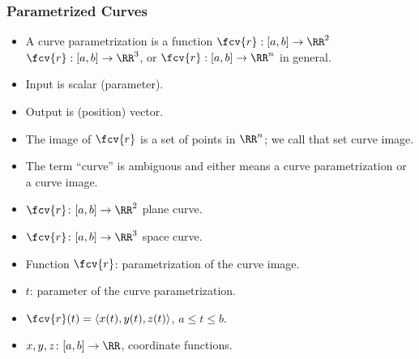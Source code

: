 \begin{frame}
\frametitle{Parametrized Curves}
\begin{itemize}
\item \alert<5>{A curve parametrization is a function} $\fcv{r}: [a,b] \to \RR^2$ $\fcv{r}:[a,b]\to \RR^{3}$, or $\fcv{r}:[a,b]\to\RR^{n}  $ in general.
\item<2-> Input is scalar (parameter).
\item<3-> Output is (position) vector.
\item<4-> The image of $\fcv{r}$ is a \alert<5>{ set of points} in $\RR^{n}$; we call that set \alert<5>{curve image}.
\item<5-> The term ``curve'' is ambiguous and either means a \alert<5>{ curve parametrization or a curve image}. 
\item<6-> $\fcv{r} \colon [a,b] \to \RR^2$ plane curve.
\item<7-> $\fcv{r} \colon [a,b] \to \RR^3$ space curve.
\item<8-> Function $\fcv{r}$: parametrization of the curve image.
\item<9-> $t$: parameter of the curve parametrization.
\item<10-> $\fcv{r}(t) = \langle x(t), y(t), z(t)\rangle$, $a \leq t \leq b$.
\item<11-> $x,y,z \colon [a,b] \to \RR$, coordinate functions.
\end{itemize}
\end{frame}